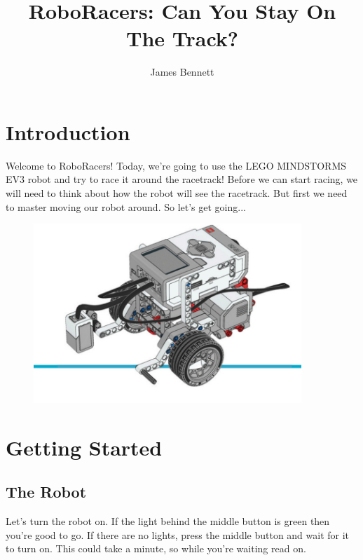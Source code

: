 \documentclass[12pt,a4paper]{article}
\title{RoboRacers: Can You Stay On The Track?}
\author{James Bennett}
\begin{document}
\maketitle

\section{Introduction}
Welcome to RoboRacers! Today, we're going to use the LEGO MINDSTORMS EV3 robot and try to race it around the racetrack! Before we can start racing, we will need to think about how the robot will see the racetrack. But first we need to master moving our robot around. So let's get going...

\begin{figure}[h]
    \centering
    \includegraphics[width=0.9\textwidth]{assets/robot_overview.jpg}
\end{figure}


\section{Getting Started}
\subsection{The Robot}
Let's turn the robot on. If the light behind the middle button is green then you're good to go. If there are no lights, press the middle button and wait for it to turn on. This could take a minute, so while you're waiting read on.
\end{document}
